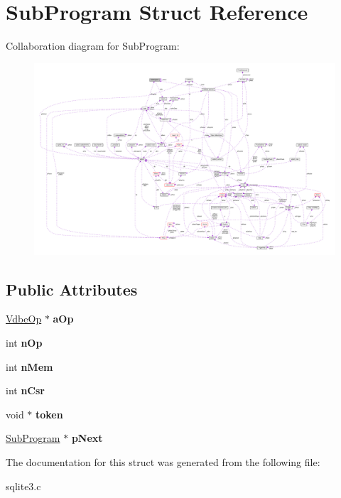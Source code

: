 \hypertarget{structSubProgram}{}\section{Sub\+Program Struct Reference}
\label{structSubProgram}


Collaboration diagram for Sub\+Program\+:\nopagebreak
\begin{figure}[H]
\begin{center}
\leavevmode
\includegraphics[width=350pt]{structSubProgram__coll__graph}
\end{center}
\end{figure}
\subsection*{Public Attributes}
\begin{DoxyCompactItemize}
\item 
\hyperlink{structVdbeOp}{Vdbe\+Op} $\ast$ {\bfseries a\+Op}\hypertarget{structSubProgram_aa9bb1992fed633d182076a35d6448c7d}{}\label{structSubProgram_aa9bb1992fed633d182076a35d6448c7d}

\item 
int {\bfseries n\+Op}\hypertarget{structSubProgram_a6fe204a75ab8254c453be77f024b6d69}{}\label{structSubProgram_a6fe204a75ab8254c453be77f024b6d69}

\item 
int {\bfseries n\+Mem}\hypertarget{structSubProgram_a9bece42fdeb81085809d7c2f8aa05616}{}\label{structSubProgram_a9bece42fdeb81085809d7c2f8aa05616}

\item 
int {\bfseries n\+Csr}\hypertarget{structSubProgram_a83b18aa5cc63aecdbf996c16af1e48bb}{}\label{structSubProgram_a83b18aa5cc63aecdbf996c16af1e48bb}

\item 
void $\ast$ {\bfseries token}\hypertarget{structSubProgram_aaea3b67899b092476b107d22a4e2022d}{}\label{structSubProgram_aaea3b67899b092476b107d22a4e2022d}

\item 
\hyperlink{structSubProgram}{Sub\+Program} $\ast$ {\bfseries p\+Next}\hypertarget{structSubProgram_a7da35488ac58a64fa30b88da56aac8b3}{}\label{structSubProgram_a7da35488ac58a64fa30b88da56aac8b3}

\end{DoxyCompactItemize}


The documentation for this struct was generated from the following file\+:\begin{DoxyCompactItemize}
\item 
sqlite3.\+c\end{DoxyCompactItemize}
